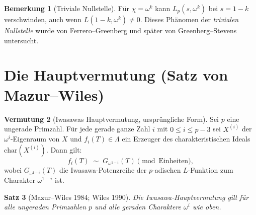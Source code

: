 \documentclass[12pt,a4paper]{amsart}
\newtheorem{theorem}{Satz}[section]
\theoremstyle{definition}
\newtheorem{remark}[theorem]{Bemerkung}
\newtheorem{conjecture}[theorem]{Vermutung}
\begin{document}
\begin{remark}[Triviale Nullstelle]
Für $\chi = \omega^k$ kann $L_p(s, \omega^k)$ bei $s = 1-k$ verschwinden,
auch wenn $L(1-k, \omega^k) \ne 0$.  Dieses Phänomen der
\emph{trivialen Nullstelle} wurde von Ferrero--Greenberg und
später von Greenberg--Stevens untersucht.
\end{remark}

\section{Die Hauptvermutung (Satz von Mazur--Wiles)}

\begin{conjecture}[Iwasawas Hauptvermutung, ursprüngliche Form]
\label{conj:haupt}
Sei $p$ eine ungerade Primzahl.  Für jede gerade ganze Zahl $i$
mit $0 \le i \le p-3$ sei $X^{(i)}$ der $\omega^i$-Eigenraum von $X$
und $f_i(T) \in \Lambda$ ein Erzeuger des charakteristischen Ideals
$\mathrm{char}(X^{(i)})$.  Dann gilt:
\[
  f_i(T) \;\sim\; G_{\omega^{1-i}}(T) \pmod{\text{Einheiten}},
\]
wobei $G_{\omega^{1-i}}(T)$ die Iwasawa-Potenzreihe der $p$-adischen
$L$-Funktion zum Charakter $\omega^{1-i}$ ist.
\end{conjecture}

\begin{theorem}[Mazur--Wiles 1984; Wiles 1990]
\label{thm:mazur_wiles}
Die Iwasawa-Hauptvermutung gilt für alle ungeraden Primzahlen $p$ und
alle geraden Charaktere $\omega^i$ wie oben.
\end{theorem}
\end{document}
